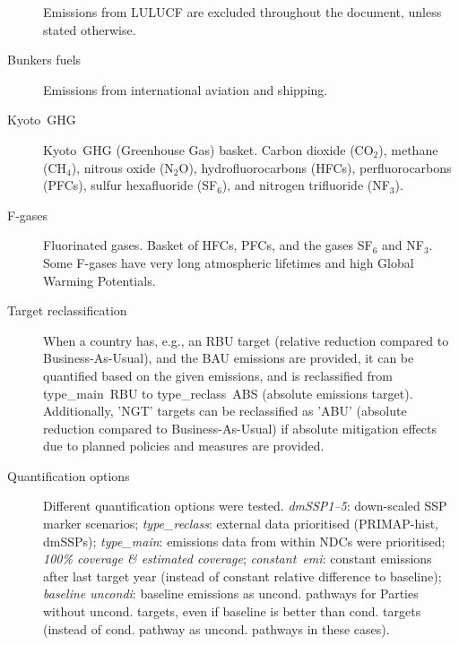 \documentclass[12pt]{article}
\begin{document}
\begin{description}
 Emissions from LULUCF are excluded throughout the document, unless stated otherwise.
 \item [Bunkers fuels] Emissions from international aviation and shipping.
 \item [Kyoto~GHG] Kyoto~GHG (Greenhouse Gas) basket. \newline
 Carbon dioxide (CO$_2$), methane (CH$_4$), nitrous oxide (N$_2$O), hydrofluorocarbons (HFCs), perfluorocarbons (PFCs), sulfur hexafluoride (SF$_6$), and nitrogen trifluoride (NF$_3$).
 \item [F-gases] Fluorinated gases. \newline
 Basket of HFCs, PFCs, and the gases SF$_6$ and NF$_3$. 
 Some F-gases have very long atmospheric lifetimes and high Global Warming Potentials.
 \item [Target reclassification] When a country has, e.g., an RBU target (relative reduction compared to Business-As-Usual), and the BAU emissions are provided, it can be quantified based on the given emissions, and is reclassified from type\_main~RBU to type\_reclass~ABS (absolute emissions target).
 Additionally, 'NGT' targets can be reclassified as 'ABU' (absolute reduction compared to Business-As-Usual) if absolute mitigation effects due to planned policies and measures are provided.
 \item [Quantification options] Different quantification options were tested. \newline
 \textit{dmSSP1--5}: down-scaled SSP marker scenarios; \newline
 \textit{type\_reclass}: external data prioritised (PRIMAP-hist, dmSSPs); \newline
 \textit{type\_main}: emissions data from within NDCs were prioritised; \newline
 \textit{100\% coverage \& estimated coverage}; \newline
 \textit{constant~emi}: constant emissions after last target year (instead of constant relative difference to baseline); \newline
 \textit{baseline uncondi}: baseline emissions as uncond. pathways for Parties without uncond. targets, even if baseline is better than cond. targets (instead of cond. pathway as uncond. pathways in these cases).
 \end{description}
\end{document}
